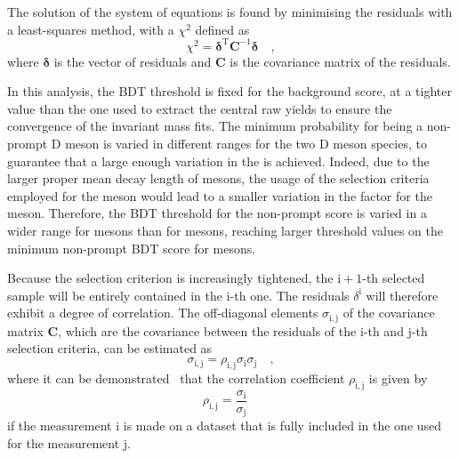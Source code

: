 The solution of the system of equations is found by minimising the residuals with a least-squares method, with a $\chi^2$ defined as 
\begin{equation*}
    \chi^2 = \pmb{\delta}^\mathrm{T}\mathbf{C}^{-1}\pmb{\delta}\quad ,
\end{equation*}
where $\pmb{\delta}$ is the vector of residuals and $\mathbf{C}$ is the covariance matrix of the residuals.

In this analysis, the BDT threshold is fixed for the background score, at a tighter value than the one used to extract the central raw yields to ensure the convergence of the invariant mass fits. The minimum probability for being a non-prompt D meson is varied in different ranges for the two D meson species, to guarantee that a large enough variation in the \fnp is achieved. Indeed, due to the larger proper mean decay length of \dpl mesons, the usage of the selection criteria employed for the \ds meson would lead to a smaller variation in the \fnp factor for the \dpl meson. Therefore, the BDT threshold for the non-prompt score is varied in a wider range for \dpl mesons than for \ds mesons, reaching larger threshold values on the minimum non-prompt BDT score for \dpl mesons. 

Because the selection criterion is increasingly tightened, the $\mathrm{i+1}$-th selected sample will be entirely contained in the $\mathrm{i}$-th one. The residuals $\delta^\mathrm{i}$ will therefore exhibit a degree of correlation. The off-diagonal elements $\sigma_\mathrm{i,j}$ of the covariance matrix $\mathbf{C}$, which are the covariance between the residuals of the i-th and j-th selection criteria, can be estimated as 
\begin{equation*}
    \sigma_\mathrm{i,j} = \rho_\mathrm{i,j}\sigma_\mathrm{i}\sigma_\mathrm{j}\quad ,
\end{equation*}
where it can be demonstrated~\cite{cowan1998statistical} that the correlation coefficient $\rho_\mathrm{i,j}$ is given by 
\begin{equation*}
    \rho_\mathrm{i,j} = \frac{\sigma_\mathrm{i}}{\sigma_\mathrm{j}}\quad 
\end{equation*}
if the measurement i is made on a dataset that is fully included in the one used for the measurement j. 

